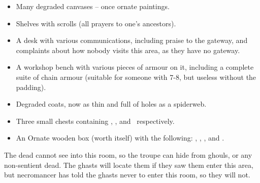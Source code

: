 \begin{multicols}{2}
\begin{itemize}
  \item
  Many degraded canvases -- once ornate paintings.
  \item
  Shelves with scrolls (all prayers to one's ancestors).
  \item
  A desk with various communications, including praise to the gateway, and complaints about how nobody visits this area, as they have no gateway.
  \item
  A workshop bench with various pieces of armour on it, including a complete suite of chain armour (suitable for someone with  7-8, but useless without the padding).
  \item
  Degraded coats, now as thin and full of holes as a spiderweb.
  \item
  Three small chests containing \lootMedium, \lootBig, and \lootBig\ respectively.
  \item
  An Ornate wooden box (worth  itself) with the following: \lootJewellery, \lootJewellery, \lootJewellery, and \lootJewellery.
\end{itemize}

The dead cannot see into this room, so the troupe can hide from ghouls, or any non-sentient dead.
The ghasts will locate them if they saw them enter this area, but \gls{necromancer} has told the ghasts never to enter this room, so they will not.

\end{multicols}
